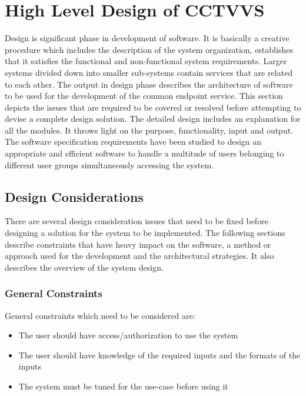 \chapter{High Level Design of CCTVVS}
Design is significant phase in development of software. It is basically a
creative procedure which includes the description of the system organization,
establishes that it satisfies the functional and non-functional system
requirements. Larger systems divided down into smaller sub-systems contain
services that are related to each other. The output in design phase describes
the architecture of software to be used for the development of the common
endpoint service. This section depicts the issues that are required to be
covered or resolved before attempting to devise a complete design solution. The
detailed design includes an explanation for all the modules. It throws light on
the purpose, functionality, input and output. The software specification
requirements have been studied to design an appropriate and efficient software
to handle a multitude of users belonging to different user groups
simultaneously accessing the system.

\section{Design Considerations}
There are several design consideration issues that need to be fixed before
designing a solution for the system to be implemented. The following sections
describe constraints that have heavy impact on the software, a method or
approach used for the development and the architectural strategies. It also
describes the overview of the system design.

    \subsection{General Constraints}
    General constraints which need to be considered are:

    \begin{itemize}
    \item The user should have access/authorization to use the system
    \item The user should have knowledge of the required inputs and the
    formats of the inputs
    \item The system must be tuned for the use-case before using it

    \end{itemize}

